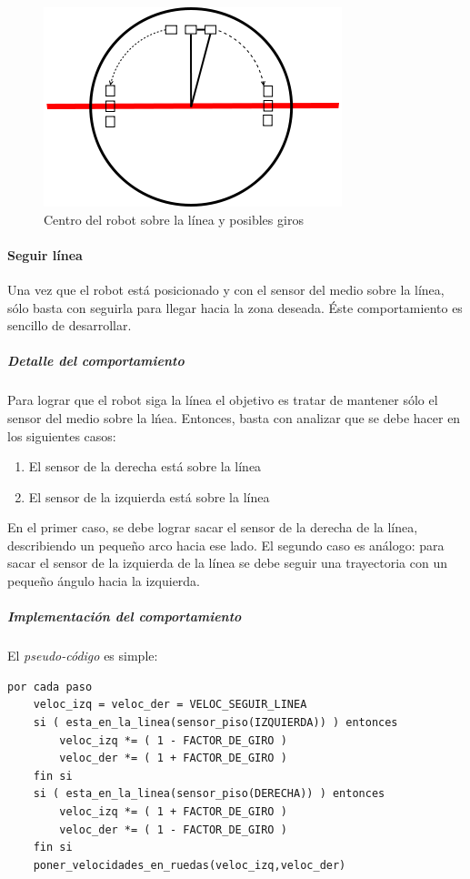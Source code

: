 \begin{figure}[htp]
\begin{center}
\includegraphics[scale=0.4]{comportamientos/floorSensorsLine3.png}
\caption{Centro del robot sobre la l\'inea y posibles giros}
\label{fig:positioned}
\end{center}
\end{figure}

\paragraph{Seguir l\'inea}
\label{follow_line}
Una vez que el robot est\'a posicionado y con el sensor del medio sobre la l\'inea,
s\'olo basta con seguirla para llegar hacia la zona deseada. \'Este comportamiento
es sencillo de desarrollar.

\subparagraph{Detalle del comportamiento}
Para lograr que el robot siga la l\'inea el objetivo es tratar de mantener s\'olo el
sensor del medio sobre la l\'nea. Entonces, basta con analizar que se debe hacer en los
siguientes casos:
\begin{enumerate}
	\item El sensor de la derecha est\'a sobre la l\'inea
	\item El sensor de la izquierda est\'a sobre la l\'inea
\end{enumerate}
En el primer caso, se debe lograr sacar el sensor de la derecha de la l\'inea,
describiendo un peque\~no arco hacia ese lado. El segundo caso es an\'alogo:
para sacar el sensor de la izquierda de la l\'inea se debe seguir una trayectoria
con un peque\~no \'angulo hacia la izquierda. 

\subparagraph{Implementaci\'on del comportamiento}
El \emph{pseudo-c\'odigo} es simple:
\begin{verbatim}
por cada paso
    veloc_izq = veloc_der = VELOC_SEGUIR_LINEA
    si ( esta_en_la_linea(sensor_piso(IZQUIERDA)) ) entonces
        veloc_izq *= ( 1 - FACTOR_DE_GIRO )
        veloc_der *= ( 1 + FACTOR_DE_GIRO )
    fin si
    si ( esta_en_la_linea(sensor_piso(DERECHA)) ) entonces
        veloc_izq *= ( 1 + FACTOR_DE_GIRO )
        veloc_der *= ( 1 - FACTOR_DE_GIRO )
    fin si
    poner_velocidades_en_ruedas(veloc_izq,veloc_der)
\end{verbatim}

